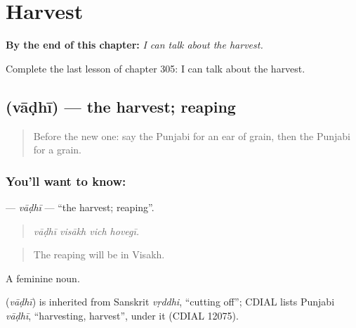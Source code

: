 
\chapter{Harvest}
\label{ch:pa-a2-harvest}

\begin{chapteropening}
\textbf{By the end of this chapter:} \emph{I can talk about the harvest.}

Complete the last lesson of chapter 305: I can talk about the harvest.
\end{chapteropening}

\section[\texorpdfstring{\pa{ਵਾਢੀ} (vāḍhī)}{ਵਾਢੀ (vāḍhī)}]{ (vāḍhī) — the harvest; reaping}

\label{lesson:PA-C305-vadhi}



\begin{quote}
Before the new one: say the Punjabi for an ear of grain, then the Punjabi for a grain.
\end{quote}

\subsection*{You'll want to know: }
\textbf{} — \emph{vāḍhī} — \textquotedblleft{}the harvest; reaping\textquotedblright{}.

\begin{quote}
   
\end{quote}

\begin{quote}
\emph{vāḍhī visākh vich hovegī.}
\end{quote}

\begin{quote}
The reaping will be in Visakh.
\end{quote}

A feminine noun.

\begin{cousinweb}
\textbf{} (\emph{vāḍhī}) is inherited from Sanskrit \emph{vṛddhi}, \textquotedblleft{}cutting off\textquotedblright{}; CDIAL lists Punjabi \emph{vāḍhī}, \textquotedblleft{}harvesting, harvest\textquotedblright{}, under it (CDIAL 12075).
\end{cousinweb}

